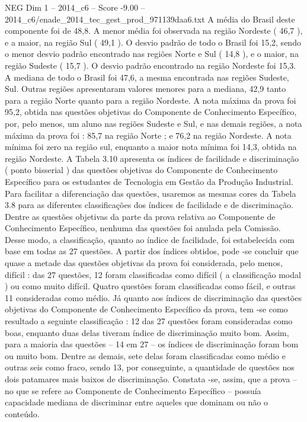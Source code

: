 \begin{textsample}{NEG Dim 1 – 2014\_c6 – Score -9.00 – 2014\_c6/enade\_2014\_tec\_gest\_prod\_971139daa6.txt}
A média do Brasil deste componente foi de 48,8.
A menor média foi observada na região Nordeste ( 46,7 ), e a maior, na região Sul ( 49,1 ).
O desvio padrão de todo o Brasil foi 15,2, sendo o menor desvio padrão encontrado nas regiões Norte e Sul ( 14,8 ), e o maior, na região Sudeste ( 15,7 ).
O desvio padrão encontrado na região Nordeste foi 15,3.
A mediana de todo o Brasil foi 47,6, a mesma encontrada nas regiões Sudeste, Sul.
Outras regiões apresentaram valores menores para a mediana, 42,9 tanto para a região Norte quanto para a região Nordeste.
A nota máxima da prova foi 95,2, obtida nas questões objetivas do Componente de Conhecimento Específico, por, pelo menos, um aluno nas regiões Sudeste e Sul, e nas demais regiões, a nota máxima da prova foi : 85,7 na região Norte ; e 76,2 na região Nordeste.
A nota mínima foi zero na região sul, enquanto a maior nota mínima foi 14,3, obtida na região Nordeste.
A Tabela 3.10 apresenta os índices de facilidade e discriminação ( ponto bisserial ) das questões objetivas do Componente de Conhecimento Específico para os estudantes de Tecnologia em Gestão da Produção Industrial.
Para facilitar a diferenciação das questões, usaremos as mesmas cores da Tabela 3.8 para as diferentes classificações dos índices de facilidade e de discriminação.
Dentre as questões objetivas da parte da prova relativa ao Componente de Conhecimento Específico, nenhuma das questões foi anulada pela Comissão.
Desse modo, a classificação, quanto ao índice de facilidade, foi estabelecida com base em todas as 27 questões.
A partir dos índices obtidos, pode -se concluir que quase a metade das questões objetivas da prova foi considerada, pelo menos, difícil : das 27 questões, 12 foram classificadas como difícil ( a classificação modal ) ou como muito difícil.
Quatro questões foram classificadas como fácil, e outras 11 consideradas como médio.
Já quanto aos índices de discriminação das questões objetivas do Componente de Conhecimento Específico da prova, tem -se como resultado a seguinte classificação : 12 das 27 questões foram consideradas como boas, enquanto duas delas tiveram índice de discriminação muito bom.
Assim, para a maioria das questões – 14 em 27 – os índices de discriminação foram bom ou muito bom.
Dentre as demais, sete delas foram classificadas como médio e outras seis como fraco, sendo 13, por conseguinte, a quantidade de questões nos dois patamares mais baixos de discriminação.
Constata -se, assim, que a prova – no que se refere ao Componente de Conhecimento Específico – possuía capacidade mediana de discriminar entre aqueles que dominam ou não o conteúdo.

\end{textsample}
